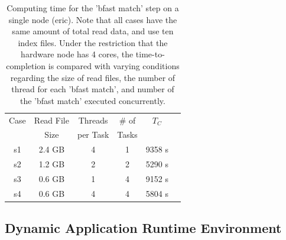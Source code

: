 \documentclass{cpeauth}
\begin{document}



 \begin{table}
 \small
 \begin{tabular}{|c|c|c|c|c|c|} 
 \hline 
Case & Read File  & Threads & \# of   & $T_C$ \\
& Size &  per Task &  Tasks &   \\  \hline
s1 & 2.4 GB &  4 & 1 & 9358 s \\
s2 & 1.2 GB & 2 & 2 & 5290 s \\
s3 & 0.6 GB & 1 & 4 & 9152 s \\ 
s4& 0.6 GB & 4 & 4 & 5804 s \\

 \hline
 \end{tabular}
 
 \caption{Computing time for the 'bfast match' step on a single node
   (eric). Note that all cases have the same amount of total read
   data, and use ten index files.  Under the restriction that the
   hardware node has 4 cores, the time-to-completion is compared with
   varying conditions regarding the size of read files, the number of
   thread for each 'bfast match', and number of the 'bfast match'
   executed concurrently.  }
    \label{table:understandio}
\end{table}



\subsection{Dynamic Application Runtime Environment}
\end{document}
